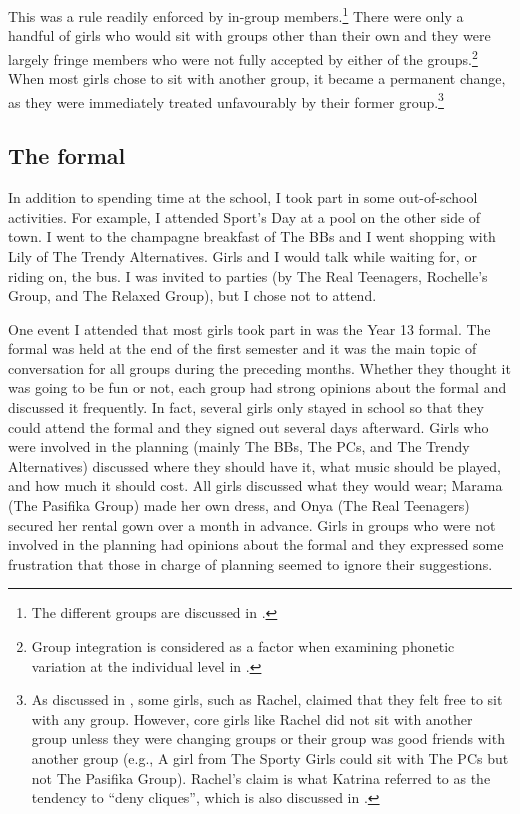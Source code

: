 This was a rule readily enforced by in-group members.\footnote{The different groups are discussed in .}  There were only a handful of girls who would sit with groups other than their own and they were largely fringe members who were not fully accepted by either of the groups.\footnote{Group integration is considered as a factor when examining phonetic variation at the individual level in .}  When most girls chose to sit with another group, it became a permanent change, as they were immediately treated unfavourably by their former group.\footnote{As discussed in , some girls, such as Rachel, claimed that they felt free to sit with any group. However, core girls like Rachel did not sit with another group unless they were changing groups or their group was good friends with another group (e.g., A girl from The Sporty Girls could sit with The PCs but not The Pasifika Group). Rachel's claim is what Katrina referred to as the tendency to ``deny cliques'', which is also discussed in .}  



\subsection{The formal}

In addition to spending time at the school, I took part in some out-of-school activities. For example, I attended Sport's Day at a pool on the other side of town. I went to the champagne breakfast of The BBs and I went shopping with Lily of The Trendy Alternatives. Girls and I would talk while waiting for, or riding on, the bus. I was invited to parties (by The Real Teenagers, Rochelle's Group, and The Relaxed Group), but I chose not to attend. 

One event I attended that most girls took part in was the Year 13 formal. The formal was held at the end of the first semester and it was the main topic of conversation for all groups during the preceding months. Whether they thought it was going to be fun or not, each group had strong opinions about the formal and discussed it frequently. In fact, several girls only stayed in school so that they could attend the formal and they signed out several days afterward. Girls who were involved in the planning (mainly The BBs, The PCs, and The Trendy Alternatives) discussed where they should have it, what music should be played, and how much it should cost. All girls discussed what they would wear; Marama (The Pasifika Group) made her own dress, and Onya (The Real Teenagers) secured her rental gown over a month in advance. Girls in groups who were not involved in the planning had opinions about the formal and they expressed some frustration that those in charge of planning seemed to ignore their suggestions.


